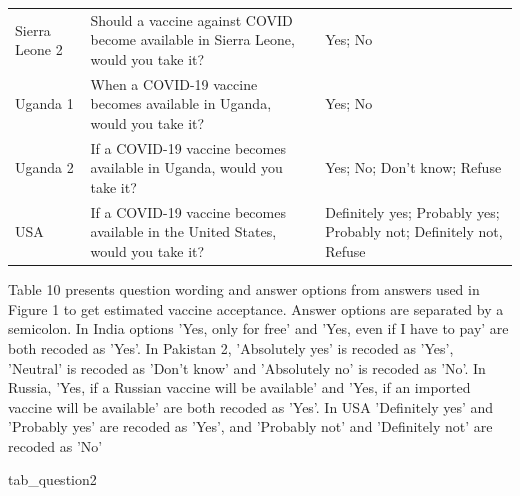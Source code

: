\documentclass[
  12pt,
]{article}
\newenvironment{Shaded}{\begin{snugshade}}{\end{snugshade}}
\newcommand{\NormalTok}[1]{#1}
\begin{document}
\begin{table}[!h]
{\begin{threeparttable}
\begin{tabular}[t]{>{\raggedright\arraybackslash}p{8em}>{\raggedright\arraybackslash}p{30em}>{\raggedright\arraybackslash}p{20em}}
Sierra Leone 2 & Should a vaccine against COVID become available in Sierra Leone, would you take it? & Yes; No\\
Uganda 1 & When a COVID-19 vaccine becomes available in Uganda, would you take it? & Yes; No\\
Uganda 2 & If a COVID-19 vaccine becomes available in Uganda, would you take it? & Yes; No; Don't know; Refuse\\
USA & If a COVID-19 vaccine becomes available in the United States, would you take it? & Definitely yes; Probably yes; Probably not; Definitely not, Refuse\\
\bottomrule
\end{tabular}
\begin{tablenotes}
\item Table 10 presents question wording and answer options from answers used in Figure 1 to get estimated vaccine acceptance. Answer options are separated by a semicolon. In India options 'Yes, only for free' and 'Yes, even if I have to pay' are both recoded as 'Yes'. In Pakistan 2, 'Absolutely yes' is recoded as 'Yes', 'Neutral' is recoded as 'Don't know' and 'Absolutely no' is recoded as 'No'. In Russia, 'Yes, if a Russian vaccine will be available' and 'Yes, if an imported vaccine will be available' are both recoded as 'Yes'. In USA 'Definitely yes' and 'Probably yes' are recoded as 'Yes', and 'Probably not' and 'Definitely not' are recoded as 'No'
\end{tablenotes}
\end{threeparttable}}
\end{table}

\begin{Shaded}
\begin{Highlighting}[]
\NormalTok{tab\_question2}
\end{Highlighting}
\end{Shaded}
\end{document}
